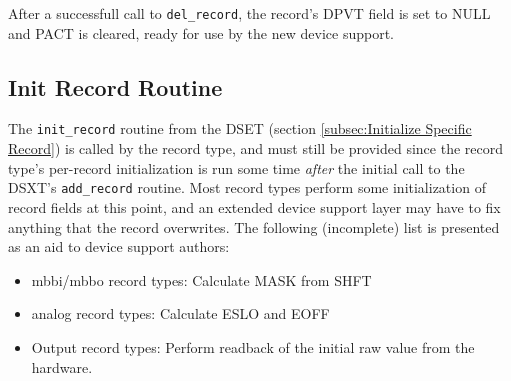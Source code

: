 After a successfull call to \verb|del_record|, the record's DPVT field is set to NULL and PACT is cleared, ready for use by the new device support.

\subsection{Init Record Routine}

The \verb|init_record| routine from the DSET (section \ref{subsec:Initialize Specific Record}) is called by the record type, and must still be provided since the record type's per-record initialization is run some time \emph{after} the initial call to the DSXT's \verb|add_record| routine.
Most record types perform some initialization of record fields at this point, and an extended device support layer may have to fix anything that the record overwrites.
The following (incomplete) list is presented as an aid to device support authors:

\begin{itemize}
\item mbbi/mbbo record types:
Calculate MASK from SHFT

\item analog record types:
Calculate ESLO and EOFF

\item Output record types:
Perform readback of the initial raw value from the hardware.

\end{itemize}


